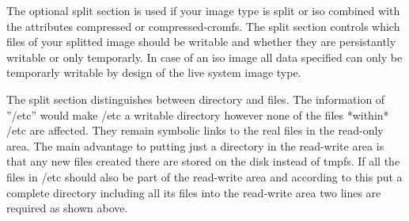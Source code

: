 The optional split section is used if your image type is split or iso
combined with the attributes compressed or compressed-cromfs. The split
section controls which files of your splitted image should be writable
and whether they are persistantly writable or only temporarly. In case
of an iso image all data specified can only be temporarly writable
by design of the live system image type.

The split section distinguishes between directory and files. The
information of ''/etc'' would make /etc a writable directory however
none of the files *within* /etc are affected. They remain symbolic
links to the real files in the read-only area. The main advantage to
putting just a directory in the read-write area is that any new
files created there are stored on the disk instead of tmpfs. If all
the files in /etc should also be part of the read-write area and
according to this put a complete directory including all its files
into the read-write area two lines are required as shown above.

